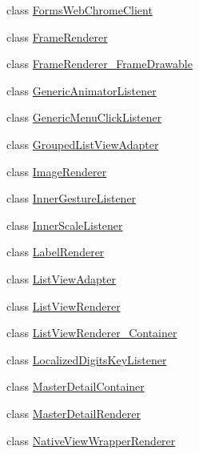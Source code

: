 \begin{CompactItemize}
\item 
class \hyperlink{classmd5b60ffeb829f638581ab2bb9b1a7f4f3f_1_1_forms_web_chrome_client}{FormsWebChromeClient}
\item 
class \hyperlink{classmd5b60ffeb829f638581ab2bb9b1a7f4f3f_1_1_frame_renderer}{FrameRenderer}
\item 
class \hyperlink{classmd5b60ffeb829f638581ab2bb9b1a7f4f3f_1_1_frame_renderer___frame_drawable}{FrameRenderer\_\-FrameDrawable}
\item 
class \hyperlink{classmd5b60ffeb829f638581ab2bb9b1a7f4f3f_1_1_generic_animator_listener}{GenericAnimatorListener}
\item 
class \hyperlink{classmd5b60ffeb829f638581ab2bb9b1a7f4f3f_1_1_generic_menu_click_listener}{GenericMenuClickListener}
\item 
class \hyperlink{classmd5b60ffeb829f638581ab2bb9b1a7f4f3f_1_1_grouped_list_view_adapter}{GroupedListViewAdapter}
\item 
class \hyperlink{classmd5b60ffeb829f638581ab2bb9b1a7f4f3f_1_1_image_renderer}{ImageRenderer}
\item 
class \hyperlink{classmd5b60ffeb829f638581ab2bb9b1a7f4f3f_1_1_inner_gesture_listener}{InnerGestureListener}
\item 
class \hyperlink{classmd5b60ffeb829f638581ab2bb9b1a7f4f3f_1_1_inner_scale_listener}{InnerScaleListener}
\item 
class \hyperlink{classmd5b60ffeb829f638581ab2bb9b1a7f4f3f_1_1_label_renderer}{LabelRenderer}
\item 
class \hyperlink{classmd5b60ffeb829f638581ab2bb9b1a7f4f3f_1_1_list_view_adapter}{ListViewAdapter}
\item 
class \hyperlink{classmd5b60ffeb829f638581ab2bb9b1a7f4f3f_1_1_list_view_renderer}{ListViewRenderer}
\item 
class \hyperlink{classmd5b60ffeb829f638581ab2bb9b1a7f4f3f_1_1_list_view_renderer___container}{ListViewRenderer\_\-Container}
\item 
class \hyperlink{classmd5b60ffeb829f638581ab2bb9b1a7f4f3f_1_1_localized_digits_key_listener}{LocalizedDigitsKeyListener}
\item 
class \hyperlink{classmd5b60ffeb829f638581ab2bb9b1a7f4f3f_1_1_master_detail_container}{MasterDetailContainer}
\item 
class \hyperlink{classmd5b60ffeb829f638581ab2bb9b1a7f4f3f_1_1_master_detail_renderer}{MasterDetailRenderer}
\item 
class \hyperlink{classmd5b60ffeb829f638581ab2bb9b1a7f4f3f_1_1_native_view_wrapper_renderer}{NativeViewWrapperRenderer}

\end{CompactItemize}
